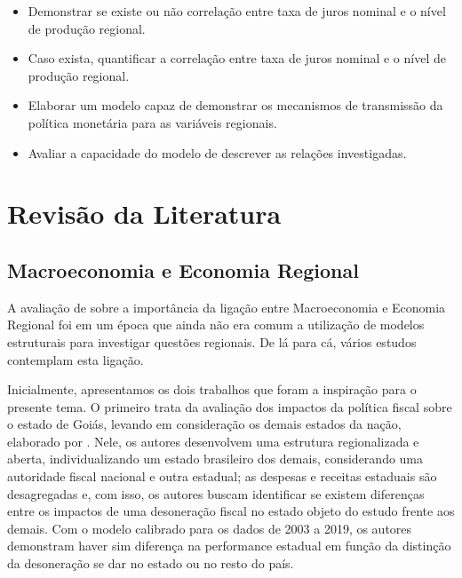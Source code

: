\documentclass[12pt]{article}
\numberwithin{equation}{section}
\theoremstyle{definition}
\begin{document}
\begin{itemize}
	\item Demonstrar se existe ou não correlação entre taxa de juros nominal e o nível de produção regional.
	\item Caso exista, quantificar a correlação entre taxa de juros nominal e o nível de produção regional.
	\item Elaborar um modelo capaz de demonstrar os mecanismos de transmissão da política monetária para as variáveis regionais.
	\item Avaliar a capacidade do modelo de descrever as relações investigadas.
\end{itemize}

\newpage

\section{Revisão da Literatura}\label{sec:revisaoDaLiteratura}


\subsection{Macroeconomia e Economia Regional}

A avaliação de \textcite{rickman_modern_2010} sobre a importância da ligação entre Macroeconomia e Economia Regional foi em um época que ainda não era comum a utilização de modelos estruturais para investigar questões regionais. De lá para cá, vários estudos contemplam esta ligação.

Inicialmente, apresentamos os dois trabalhos que foram a inspiração para o presente tema. O primeiro trata da avaliação dos impactos da política fiscal sobre o estado de Goiás, levando em consideração os demais estados da nação, elaborado por \textcite{costa_junior_dsge_2022}. Nele, os autores desenvolvem uma estrutura regionalizada e aberta, individualizando um estado brasileiro dos demais, considerando uma autoridade fiscal nacional e outra estadual; as despesas e receitas estaduais são desagregadas e, com isso, os autores buscam identificar se existem diferenças entre os impactos de uma desoneração fiscal no estado objeto do estudo frente aos demais. Com o modelo calibrado para os dados de 2003 a 2019, os autores demonstram haver sim diferença na performance estadual em função da distinção da desoneração se dar no estado ou no resto do país.
\end{document}
